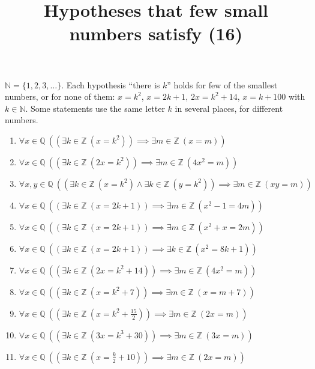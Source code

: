 \documentclass[11pt,a4paper]{article}
\title{Hypotheses that few small numbers satisfy (16)}
\author{}
\date{}
\begin{document}
\maketitle
$\mathbb{N} = \{1, 2, 3, \ldots\}$. Each hypothesis ``there is $k$'' holds for few of the smallest numbers, or for none of them: $x = k^{2}$, $x = 2k + 1$, $2x = k^{2} + 14$, $x = k + 100$ with $k \in \mathbb{N}$. Some statements use the same letter $k$ in several places, for different numbers.

\begin{enumerate}
\item $\displaystyle \forall x \in \mathbb{Q}\ ((\exists k \in \mathbb{Z}\ (x = k^{2})) \implies \exists m \in \mathbb{Z}\ (x = m))$
\item $\displaystyle \forall x \in \mathbb{Q}\ ((\exists k \in \mathbb{Z}\ (2x = k^{2})) \implies \exists m \in \mathbb{Z}\ (4x^{2} = m))$
\item $\displaystyle \forall x, y \in \mathbb{Q}\ ((\exists k \in \mathbb{Z}\ (x = k^{2}) \land \exists k \in \mathbb{Z}\ (y = k^{2})) \implies \exists m \in \mathbb{Z}\ (xy = m))$
\item $\displaystyle \forall x \in \mathbb{Q}\ ((\exists k \in \mathbb{Z}\ (x = 2k + 1)) \implies \exists m \in \mathbb{Z}\ (x^{2} - 1 = 4m))$
\item $\displaystyle \forall x \in \mathbb{Q}\ ((\exists k \in \mathbb{Z}\ (x = 2k + 1)) \implies \exists m \in \mathbb{Z}\ (x^{2} + x = 2m))$
\item $\displaystyle \forall x \in \mathbb{Q}\ ((\exists k \in \mathbb{Z}\ (x = 2k + 1)) \implies \exists k \in \mathbb{Z}\ (x^{2} = 8k + 1))$
\item $\displaystyle \forall x \in \mathbb{Q}\ ((\exists k \in \mathbb{Z}\ (2x = k^{2} + 14)) \implies \exists m \in \mathbb{Z}\ (4x^{2} = m))$
\item $\displaystyle \forall x \in \mathbb{Q}\ ((\exists k \in \mathbb{Z}\ (x = k^{2} + 7)) \implies \exists m \in \mathbb{Z}\ (x = m + 7))$
\item $\displaystyle \forall x \in \mathbb{Q}\ ((\exists k \in \mathbb{Z}\ (x = k^{2} + \frac{15}{2})) \implies \exists m \in \mathbb{Z}\ (2x = m))$
\item $\displaystyle \forall x \in \mathbb{Q}\ ((\exists k \in \mathbb{Z}\ (3x = k^{3} + 30)) \implies \exists m \in \mathbb{Z}\ (3x = m))$
\item $\displaystyle \forall x \in \mathbb{Q}\ ((\exists k \in \mathbb{Z}\ (x = \frac{k}{2} + 10)) \implies \exists m \in \mathbb{Z}\ (2x = m))$

\end{enumerate}
\end{document}
